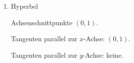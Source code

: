 \begin{enumerate}
\begin{enumerate}
                    Tangenten parallel zur \(x\)-Achse: \( \left(1, 2\right)\).

                    Tangenten parallel zur \(y\)-Achse: keine.

              \item Hyperbel

                    Achsenschnittpunkte \( \left(0, 1\right)\).

                    Tangenten parallel zur \(x\)-Achse: \( \left(0, 1\right)\).

                    Tangenten parallel zur \(y\)-Achse: keine.




          \end{enumerate}
\end{enumerate}




